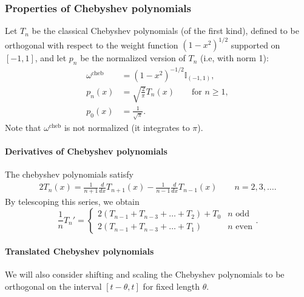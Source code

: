 \documentclass[../hippo.tex]{subfiles}
\begin{document}
\subsubsection{Properties of Chebyshev polynomials}
\label{sec:chebyshev-properties}

Let $T_n$ be the classical Chebyshev polynomials (of the first kind), defined to
be orthogonal with respect to the weight function $(1-x^2)^{1/2}$ supported on
$[-1, 1]$,
and let $p_n$ be the normalized version of $T_n$ (i.e, with norm 1):
\begin{align*}
  \omega^{\mathrm{cheb}} &= (1-x^2)^{-1/2} \mathbb{I}_{(-1, 1)},
  \\
  p_n(x) &= \sqrt{\frac{2}{\pi}} T_n(x) \qquad \text{for } n \geq 1,
  \\
  p_0(x) &= \frac{1}{\sqrt\pi}.
\end{align*}
Note that $\omega^{\mathrm{cheb}}$ is not normalized (it integrates to $\pi$).


\paragraph{Derivatives of Chebyshev polynomials}
The chebyshev polynomials satisfy
\begin{align*}
  2T_n(x) = \frac{1}{n+1} \frac{d}{d x} T_{n+1}(x) - \frac{1}{n-1} \frac{d}{dx} T_{n-1}(x) \qquad n = 2, 3, \dots
  .
\end{align*}
By telescoping this series, we obtain
\begin{equation}
  \label{eq:chebyshev-derivative}
  \frac{1}{n} T_n' =
  \begin{cases}
    2(T_{n-1} + T_{n-3} + \dots + T_2) + T_0  & n \mbox{ odd}
    \\
    2(T_{n-1} + T_{n-3} + \dots + T_1) & n \mbox{ even}
  \end{cases}
  .
\end{equation}



\paragraph{Translated Chebyshev polynomials}
We will also consider shifting and scaling the Chebyshev polynomials to be orthogonal on the
interval $[t-\theta, t]$ for fixed length $\theta$.
\end{document}
